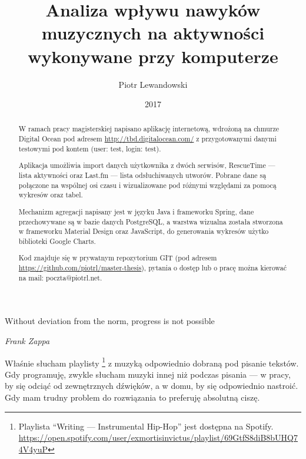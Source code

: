 \documentclass[brudnopis]{xmgr}
\author   {Piotr Lewandowski}
\title    {Analiza wpływu nawyków muzycznych na aktywności wykonywane przy komputerze}
\date     {2017}
\begin{document}
\begin{abstract}
    W ramach pracy magisterskiej napisano aplikację internetową,
    wdrożoną na chmurze Digital Ocean pod adresem \url{http://tbd.digitalocean.com/}
    z przygotowanymi danymi testowymi pod kontem (user: test, login: test).

    Aplikacja umożliwia import danych użytkownika z dwóch serwisów,
    RescueTime — lista aktywności oraz
    Last.fm — lista odsłuchiwanych utworów.
    Pobrane dane są połączone na wspólnej osi czasu i wizualizowane pod różnymi względami za pomocą wykresów oraz tabel.

    Mechanizm agregacji napisany jest w języku Java i frameworku Spring,
    dane przechowywane są w bazie danych PostgreSQL,
    a warstwa wizualna została stworzona w frameworku Material Design oraz JavaScript,
    do generowania wykresów użytko biblioteki Google Charts.

    Kod znajduje się w prywatnym repozytorium GIT (pod adresem \url{https://github.com/piotrl/master-thesis}),
    pytania o dostęp lub o pracę można kierować na mail: poczta@piotrl.net.
\end{abstract}


\maketitle

\introduction

\epigraph{Without deviation from the norm, progress is not possible}{\textit{Frank Zappa}}

    Właśnie słucham playlisty
    \footnote{Playlista ``Writing --- Instrumental Hip-Hop'' jest dostępna na Spotify.
    \url{https://open.spotify.com/user/exmortisinvictus/playlist/69GtfS8diB8bUHQ74V4yuP}}
    z muzyką odpowiednio dobraną pod pisanie tekstów.
    Gdy programuję, zwykle słucham muzyki innej niż podczas pisania ---
    w pracy, by się odciąć od zewnętrznych dźwięków, a w domu, by się odpowiednio nastroić.
    Gdy mam trudny problem do rozwiązania to preferuję absolutną ciszę.
\end{document}
